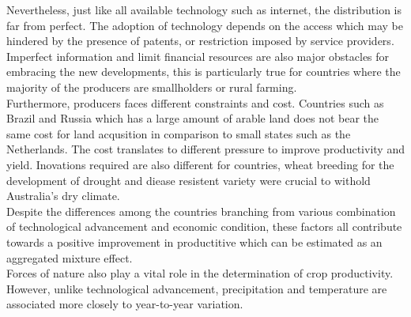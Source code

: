 \documentclass[nojss]{jss}\usepackage[]{graphicx}\usepackage[]{color}
\begin{document}
Nevertheless, just like all available technology such as internet, the
distribution is far from perfect. The adoption of technology depends
on the access which may be hindered by the presence of patents, or
restriction imposed by service providers. Imperfect information and
limit financial resources are also major obstacles for embracing the
new developments, this is particularly true for countries where the
majority of the producers are smallholders or rural farming.\\

Furthermore, producers faces different constraints and cost. Countries
such as Brazil and Russia which has a large amount of arable land does
not bear the same cost for land acqusition in comparison to small
states such as the Netherlands. The cost translates to different
pressure to improve productivity and yield. Inovations required are
also different for countries, wheat breeding for the development of
drought and diease resistent variety were crucial to withold
Australia's dry climate.  \\


Despite the differences among the countries branching from various
combination of technological advancement and economic condition, these
factors all contribute towards a positive improvement in productitive
which can be estimated as an aggregated mixture effect.\\

Forces of nature also play a vital role in the determination of crop
productivity. However, unlike technological advancement, precipitation
and temperature are associated more closely to year-to-year variation.\\
\end{document}
